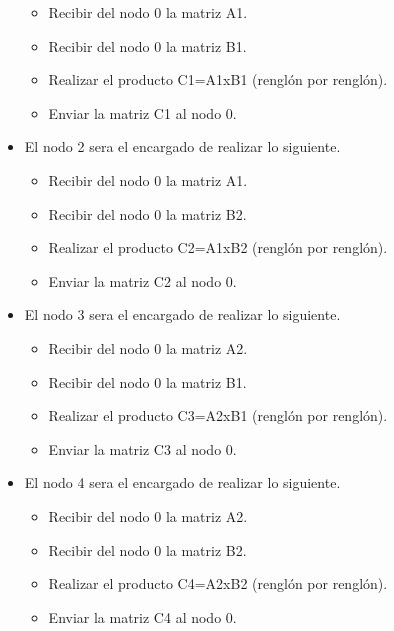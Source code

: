 \documentclass[11pt]{article}
\begin{document}
\begin{itemize}
				\begin{itemize}
					\item Recibir del nodo 0 la matriz A1.
					\item Recibir del nodo 0 la matriz B1.
					\item Realizar el producto C1=A1xB1 (renglón por renglón).
					\item Enviar la matriz C1 al nodo 0.
				\end{itemize}	
			\item El nodo 2 sera el encargado de realizar lo siguiente.
				\begin{itemize}
					\item Recibir del nodo 0 la matriz A1.
					\item Recibir del nodo 0 la matriz B2.
					\item Realizar el producto C2=A1xB2 (renglón por renglón).
					\item Enviar la matriz C2 al nodo 0.
				\end{itemize}
			\item El nodo 3 sera el encargado de realizar lo siguiente.
				\begin{itemize}
					\item Recibir del nodo 0 la matriz A2.
					\item Recibir del nodo 0 la matriz B1.
					\item Realizar el producto C3=A2xB1 (renglón por renglón).
					\item Enviar la matriz C3 al nodo 0.
				\end{itemize}
			\item El nodo 4 sera el encargado de realizar lo siguiente.
				\begin{itemize}
					\item Recibir del nodo 0 la matriz A2.
					\item Recibir del nodo 0 la matriz B2.
					\item Realizar el producto C4=A2xB2 (renglón por renglón).
					\item Enviar la matriz C4 al nodo 0.
				\end{itemize}
		\end{itemize}
\end{document}

